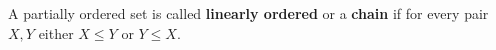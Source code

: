A partially ordered set is called \textbf{linearly ordered} or a \textbf{chain} if for every pair $X, Y$ either $X \leq Y$ or $Y \leq X$.
